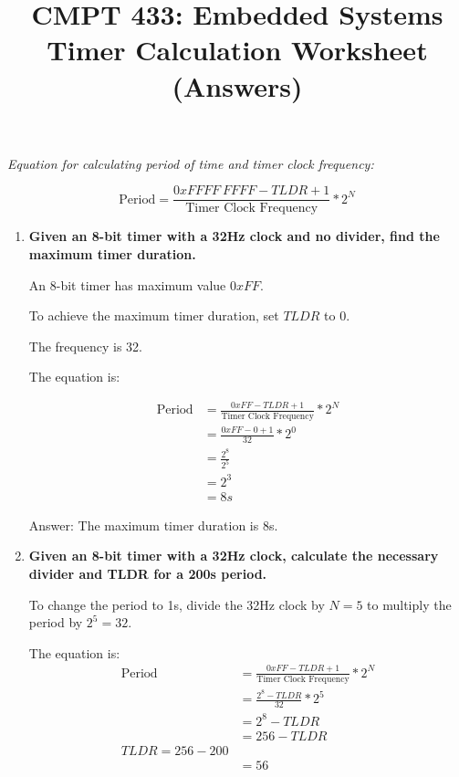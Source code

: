 \documentclass[10pt, oneside, letterpaper]{article}
\title{CMPT 433: Embedded Systems \\\medskip \Large Timer Calculation Worksheet (Answers)}
\author{}
\date{}
\begin{document}
	\maketitle
	
	\textit{Equation for calculating period of time and timer clock frequency:}
	
	\begin{equation}
		\textrm{Period} = \frac{0xFFFF\ FFFF - TLDR + 1}{\textrm{Timer Clock Frequency}} * 2^N
	\end{equation}
		
	\vspace{1cm}

	\begin{enumerate}

		\item \textbf{Given an 8-bit timer with a 32Hz clock and no divider, find the maximum timer duration.}
	
		An 8-bit timer has maximum value $0xFF$.
	
		To achieve the maximum timer duration, set $TLDR$ to $0$.
	
		The frequency is 32.
	
		The equation is:

		\begin{align}
			\textrm{Period}
			&= \frac{0xFF - TLDR + 1}{\textrm{Timer Clock Frequency}} * 2^N \\
			&= \frac{0xFF - 0 + 1}{32} * 2^0 \\
			&= \frac{2^8}{2^5} \\
			&= 2^3 \\
			&= 8s
		\end{align}
	
		Answer: The maximum timer duration is 8s.
	
		\clearpage
		
		

		\item \textbf{Given an 8-bit timer with a 32Hz clock, calculate the necessary divider and TLDR for a 200s period.}
	
		To change the period to 1s, divide the 32Hz clock by $N = 5$ to multiply the period by $2^5 = 32$.
	
		The equation is:
		\begin{align}
			\textrm{Period}
			&= \frac{0xFF - TLDR + 1}{\textrm{Timer Clock Frequency}} * 2^N \\
			&= \frac{2^8 - TLDR}{32} * 2^5 \\
			&= 2^8 - TLDR \\
			&= 256 - TLDR \\
			TLDR = 256-200 \\
			&= 56
		\end{align}
	

\end{enumerate}
\end{document}
